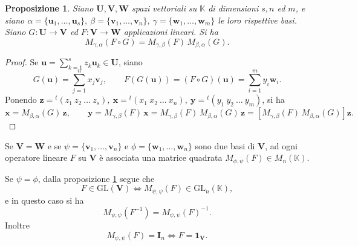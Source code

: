 \documentclass{article}
\theoremstyle{plain}
\newtheorem{prop}[thm]{Proposizione}
\theoremstyle{definition}
\theoremstyle{remark}
\begin{document}
\vspace{10pt}

\begin{bxthm}
\begin{prop}\label{dodicitre}
    Siano $\mathbf{U}, \mathbf{V}, \mathbf{W}$ spazi vettoriali su $\mathbb{K}$ di dimensioni $s, n$ ed $m$, e siano 
    $\alpha = \{\mathbf{u}_1, \dots, \mathbf{u}_s\},\ \beta = \{\mathbf{v}_1, \dots, \mathbf{v}_n\},\ \gamma = \{\mathbf{w}_1, \dots, \mathbf{w}_m\}$ 
    le loro rispettive basi. Siano $G: \mathbf{U} \to \mathbf{V}$ ed $F: \mathbf{V} \to \mathbf{W}$ applicazioni lineari. 
    Si ha
    \[M_{\gamma,\alpha}(F \circ G) = M_{\gamma,\beta}(F) \, M_{\beta,\alpha}(G).\]
\end{prop}
\end{bxthm}
\begin{proof}
Se $\mathbf{u} = \sum_{k=1}^{s}z_k \mathbf{u}_k\in \mathbf{U}$, siano
\[
G(\mathbf{u}) = \sum_{j=1}^{n}x_j \mathbf{v}_j,\quad\quad F(G(\mathbf{u})) = (F \circ G)(\mathbf{u}) = \sum_{i=1}^{m}y_i \mathbf{w}_i.
\]
Ponendo $\mathbf{z} = {}^t(z_1\ z_2\ \dots\ z_s),\ \mathbf{x} = {}^t(x_1\ x_2\ \dots\ x_n),\ \mathbf{y} = {}^t(y_1\ y_2\ \dots\ y_m)$, si ha
\[
\mathbf{x} = M_{\beta,\alpha}(G) \, \mathbf{z},\quad\quad \mathbf{y} = M_{\gamma,\beta}(F) \, \mathbf{x} = M_{\gamma,\beta}(F) \,  M_{\beta,\alpha}(G) \, \mathbf{z} = \left[ M_{\gamma,\beta}(F) \,  M_{\beta,\alpha}(G) \right] \mathbf{z}.
\]    
\end{proof}

\vspace{10pt}

Se $\mathbf{V} = \mathbf{W}$ e se $\psi = \{\mathbf{v}_1, \dots, \mathbf{v}_n\}$ e $\phi = \{\mathbf{w}_1, \dots, \mathbf{w}_n\}$ 
sono due basi di $\mathbf{V}$, ad ogni operatore lineare $F$ su $\mathbf{V}$ è associata una matrice quadrata $M_{\phi,\psi}(F) \in M_n(\mathbb{K})$.

\vspace{10pt}

Se $\psi=\phi$, dalla proposizione \ref{dodicitre} segue che 
\[F \in \mathrm{GL}(\mathbf{V})\iff M_{\psi,\psi}(F) \in \mathrm{GL}_n(\mathbb{K}),\]
e in questo caso si ha
\[
M_{\psi,\psi}(F^{-1}) = M_{\psi,\psi}(F)^{-1}.
\]
Inoltre 
\[M_{\psi,\psi}(F) = \mathbf{I}_n\iff F = \mathbf{1_V}.\]
\end{document}
